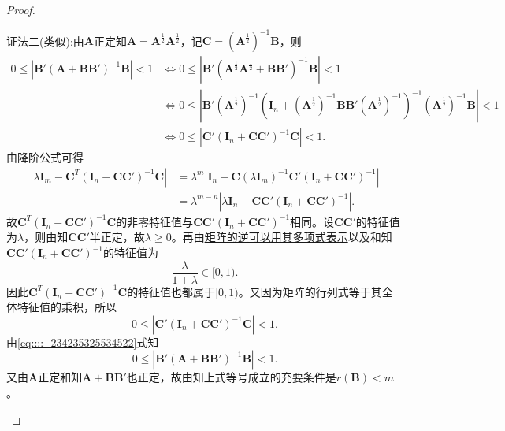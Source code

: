 \documentclass[../../main.tex]{subfiles}%
\begin{document}
\begin{proof}
\begin{enumerate}[(1)]
{\color{blue}证法二(类似):}由$\boldsymbol{A}$正定知$\boldsymbol{A} = \boldsymbol{A}^{\frac{1}{2}}\boldsymbol{A}^{\frac{1}{2}}$，记$\boldsymbol{C} = \left( \boldsymbol{A}^{\frac{1}{2}} \right)^{-1}\boldsymbol{B}$，则
\begin{align}
0 \leqslant \left| \boldsymbol{B}' \left( \boldsymbol{A} + \boldsymbol{BB}' \right)^{-1}\boldsymbol{B} \right| < 1
&\Longleftrightarrow 0 \leqslant \left| \boldsymbol{B}' \left( \boldsymbol{A}^{\frac{1}{2}}\boldsymbol{A}^{\frac{1}{2}} + \boldsymbol{BB}' \right)^{-1}\boldsymbol{B} \right| < 1 \nonumber \\
&\Longleftrightarrow 0 \leqslant \left| \boldsymbol{B}' \left( \boldsymbol{A}^{\frac{1}{2}} \right)^{-1} \left( \boldsymbol{I}_n + \left( \boldsymbol{A}^{\frac{1}{2}} \right)^{-1}\boldsymbol{BB}' \left( \boldsymbol{A}^{\frac{1}{2}} \right)^{-1} \right)^{-1} \left( \boldsymbol{A}^{\frac{1}{2}} \right)^{-1}\boldsymbol{B} \right| < 1 \nonumber \\
&\Longleftrightarrow 0 \leqslant \left| \boldsymbol{C}' \left( \boldsymbol{I}_n + \boldsymbol{CC}' \right)^{-1}\boldsymbol{C} \right| < 1. \label{eq::::--234235325534522}
\end{align}
由降阶公式可得
\begin{align*}
\left| \lambda \boldsymbol{I}_m - \boldsymbol{C}^{T} \left( \boldsymbol{I}_n + \boldsymbol{CC}' \right)^{-1}\boldsymbol{C} \right| &= \lambda^m \left| \boldsymbol{I}_n - \boldsymbol{C} \left( \lambda \boldsymbol{I}_m \right)^{-1}\boldsymbol{C}' \left( \boldsymbol{I}_n + \boldsymbol{CC}' \right)^{-1} \right| \\
&= \lambda^{m-n} \left| \lambda \boldsymbol{I}_n - \boldsymbol{CC}' \left( \boldsymbol{I}_n + \boldsymbol{CC}' \right)^{-1} \right|.
\end{align*}
故$\boldsymbol{C}^{T} \left( \boldsymbol{I}_n + \boldsymbol{CC}' \right)^{-1}\boldsymbol{C}$的非零特征值与$\boldsymbol{CC}' \left( \boldsymbol{I}_n + \boldsymbol{CC}' \right)^{-1}$相同。设$\boldsymbol{CC}'$的特征值为$\lambda$，则由知$\boldsymbol{CC}'$半正定，故$\lambda \geqslant 0$。再由\hyperref[proposition:矩阵的逆可以用其多项式表示]{矩阵的逆可以用其多项式表示}以及和知$\boldsymbol{CC}' \left( \boldsymbol{I}_n + \boldsymbol{CC}' \right)^{-1}$的特征值为
$$\frac{\lambda}{1 + \lambda} \in [0, 1).$$
因此$\boldsymbol{C}^{T} \left( \boldsymbol{I}_n + \boldsymbol{CC}' \right)^{-1}\boldsymbol{C}$的特征值也都属于$[0, 1)$。又因为矩阵的行列式等于其全体特征值的乘积，所以
$$0 \leqslant \left| \boldsymbol{C}' \left( \boldsymbol{I}_n + \boldsymbol{CC}' \right)^{-1}\boldsymbol{C} \right| < 1.$$
由\eqref{eq::::--234235325534522}式知
$$0 \leqslant \left| \boldsymbol{B}' \left( \boldsymbol{A} + \boldsymbol{BB}' \right)^{-1}\boldsymbol{B} \right| < 1.$$
又由$\boldsymbol{A}$正定和知$\boldsymbol{A} + \boldsymbol{BB}'$也正定，故由知上式等号成立的充要条件是$r\left( \boldsymbol{B} \right) < m$。


\end{enumerate}
\end{proof}
\end{document}
